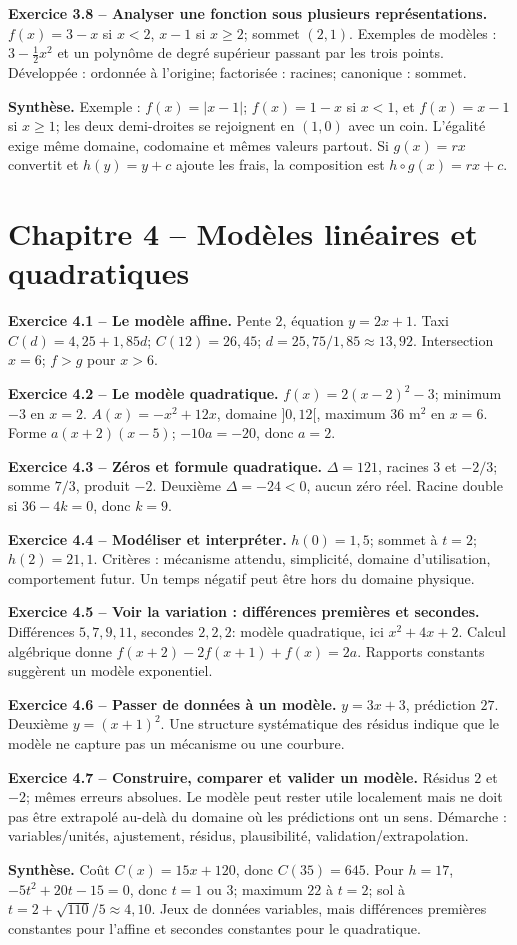 \begin{answerbox}
\textbf{Exercice 3.8 -- Analyser une fonction sous plusieurs représentations.} $f(x)=3-x$ si $x<2$, $x-1$ si $x\ge2$; sommet $(2,1)$. Exemples de modèles : $3-\frac12x^2$ et un polynôme de degré supérieur passant par les trois points. Développée : ordonnée à l'origine; factorisée : racines; canonique : sommet.\par
\medskip\textbf{Synthèse.} Exemple : $f(x)=|x-1|$; \(f(x)=1-x\) si \(x<1\), et \(f(x)=x-1\) si \(x\ge1\); les deux demi-droites se rejoignent en \((1,0)\) avec un coin. L'égalité exige même domaine, codomaine et mêmes valeurs partout. Si $g(x)=rx$ convertit et $h(y)=y+c$ ajoute les frais, la composition est $h\circ g(x)=rx+c$.
\end{answerbox}
\chapter*{Chapitre 4 -- Modèles linéaires et quadratiques}
\begin{answerbox}
\textbf{Exercice 4.1 -- Le modèle affine.} Pente $2$, équation $y=2x+1$. Taxi $C(d)=4{,}25+1{,}85d$; $C(12)=26{,}45$; $d=25{,}75/1{,}85\approx13{,}92$. Intersection $x=6$; $f>g$ pour $x>6$.\par
\textbf{Exercice 4.2 -- Le modèle quadratique.} $f(x)=2(x-2)^2-3$; minimum $-3$ en $x=2$. $A(x)=-x^2+12x$, domaine $]0,12[$, maximum $36$ m$^2$ en $x=6$. Forme $a(x+2)(x-5)$; $-10a=-20$, donc $a=2$.\par
\textbf{Exercice 4.3 -- Zéros et formule quadratique.} $\Delta=121$, racines $3$ et $-2/3$; somme $7/3$, produit $-2$. Deuxième $\Delta=-24<0$, aucun zéro réel. Racine double si $36-4k=0$, donc $k=9$.\par
\textbf{Exercice 4.4 -- Modéliser et interpréter.} $h(0)=1{,}5$; sommet à $t=2$; $h(2)=21{,}1$. Critères : mécanisme attendu, simplicité, domaine d'utilisation, comportement futur. Un temps négatif peut être hors du domaine physique.\par
\textbf{Exercice 4.5 -- Voir la variation : différences premières et secondes.} Différences $5,7,9,11$, secondes $2,2,2$: modèle quadratique, ici $x^2+4x+2$. Calcul algébrique donne $f(x+2)-2f(x+1)+f(x)=2a$. Rapports constants suggèrent un modèle exponentiel.\par
\textbf{Exercice 4.6 -- Passer de données à un modèle.} $y=3x+3$, prédiction $27$. Deuxième $y=(x+1)^2$. Une structure systématique des résidus indique que le modèle ne capture pas un mécanisme ou une courbure.\par
\textbf{Exercice 4.7 -- Construire, comparer et valider un modèle.} Résidus $2$ et $-2$; mêmes erreurs absolues. Le modèle peut rester utile localement mais ne doit pas être extrapolé au-delà du domaine où les prédictions ont un sens. Démarche : variables/unités, ajustement, résidus, plausibilité, validation/extrapolation.\par
\medskip\textbf{Synthèse.} Coût $C(x)=15x+120$, donc $C(35)=645$. Pour $h=17$, $-5t^2+20t-15=0$, donc $t=1$ ou $3$; maximum $22$ à $t=2$; sol à $t=2+\sqrt{110}/5\approx4{,}10$. Jeux de données variables, mais différences premières constantes pour l'affine et secondes constantes pour le quadratique.
\end{answerbox}
